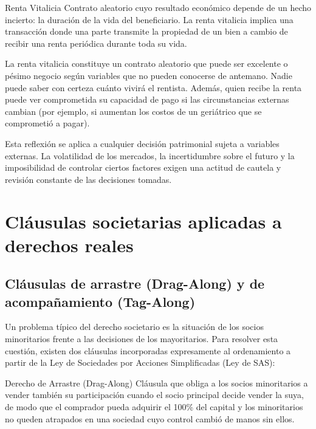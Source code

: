 \documentclass[12pt,oneside]{book}
\begin{document}
\begin{definition}{Renta Vitalicia}
Contrato aleatorio cuyo resultado económico depende de un hecho incierto: la duración de la vida del beneficiario. La renta vitalicia implica una transacción donde una parte transmite la propiedad de un bien a cambio de recibir una renta periódica durante toda su vida.
\end{definition}

\begin{important}
La renta vitalicia constituye un contrato aleatorio que puede ser excelente o pésimo negocio según variables que no pueden conocerse de antemano. Nadie puede saber con certeza cuánto vivirá el rentista. Además, quien recibe la renta puede ver comprometida su capacidad de pago si las circunstancias externas cambian (por ejemplo, si aumentan los costos de un geriátrico que se comprometió a pagar).
\end{important}

Esta reflexión se aplica a cualquier decisión patrimonial sujeta a variables externas. La volatilidad de los mercados, la incertidumbre sobre el futuro y la imposibilidad de controlar ciertos factores exigen una actitud de cautela y revisión constante de las decisiones tomadas.


\chapter{Cláusulas societarias aplicadas a derechos reales}

\section{Cláusulas de arrastre (Drag-Along) y de acompañamiento (Tag-Along)}

Un problema típico del derecho societario es la situación de los socios minoritarios frente a las decisiones de los mayoritarios. Para resolver esta cuestión, existen dos cláusulas incorporadas expresamente al ordenamiento a partir de la Ley de Sociedades por Acciones Simplificadas (Ley de SAS):

\begin{definition}{Derecho de Arrastre (Drag-Along)}
Cláusula que obliga a los socios minoritarios a vender también su participación cuando el socio principal decide vender la suya, de modo que el comprador pueda adquirir el 100\% del capital y los minoritarios no queden atrapados en una sociedad cuyo control cambió de manos sin ellos.
\end{definition}
\end{document}
